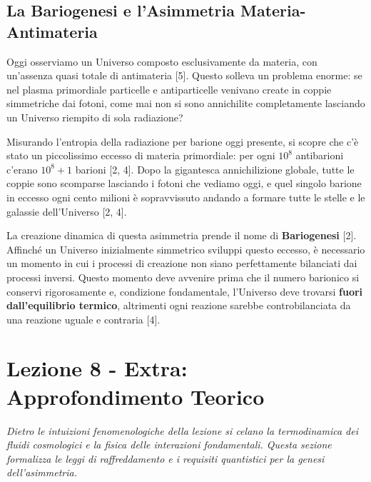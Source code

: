 \documentclass[11pt,a4paper]{report}
\begin{document}
\subsection{La Bariogenesi e l'Asimmetria Materia-Antimateria}
Oggi osserviamo un Universo composto esclusivamente da materia, con un'assenza quasi totale di antimateria [5]. Questo solleva un problema enorme: se nel plasma primordiale particelle e antiparticelle venivano create in coppie simmetriche dai fotoni, come mai non si sono annichilite completamente lasciando un Universo riempito di sola radiazione?

Misurando l'entropia della radiazione per barione oggi presente, si scopre che c'è stato un piccolissimo eccesso di materia primordiale: per ogni $10^8$ antibarioni c'erano $10^8 + 1$ barioni [2, 4]. Dopo la gigantesca annichilizione globale, tutte le coppie sono scomparse lasciando i fotoni che vediamo oggi, e quel singolo barione in eccesso ogni cento milioni è sopravvissuto andando a formare tutte le stelle e le galassie dell'Universo [2, 4].

La creazione dinamica di questa asimmetria prende il nome di \textbf{Bariogenesi} [2]. Affinché un Universo inizialmente simmetrico sviluppi questo eccesso, è necessario un momento in cui i processi di creazione non siano perfettamente bilanciati dai processi inversi. Questo momento deve avvenire prima che il numero barionico si conservi rigorosamente e, condizione fondamentale, l'Universo deve trovarsi \textbf{fuori dall'equilibrio termico}, altrimenti ogni reazione sarebbe controbilanciata da una reazione uguale e contraria [4].

\newpage
\section{Lezione 8 - Extra: Approfondimento Teorico}

\textit{Dietro le intuizioni fenomenologiche della lezione si celano la termodinamica dei fluidi cosmologici e la fisica delle interazioni fondamentali. Questa sezione formalizza le leggi di raffreddamento e i requisiti quantistici per la genesi dell'asimmetria.}
\end{document}
